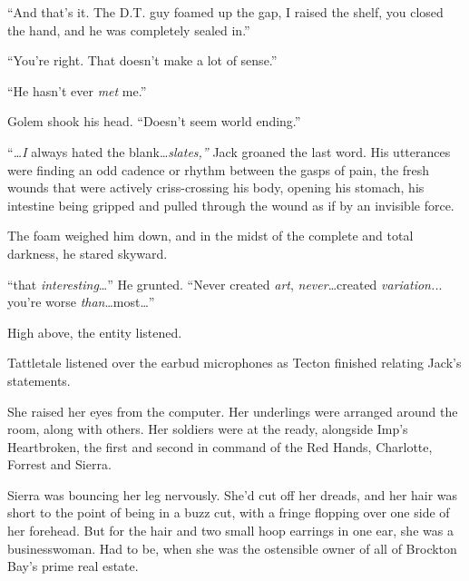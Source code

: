 ``And that's it.  The D.T. guy foamed up the gap, I raised the shelf, you closed the hand, and he was completely sealed in.''



``You're right.  That doesn't make a lot of sense.''



``He hasn't ever \emph{met} me.''



Golem shook his head.  ``Doesn't seem world ending.''



\sectionbreak



``\emph{\ldots}\emph{I }always hated the blank\ldots \emph{slates,'' }Jack groaned the last word.  His utterances were finding an odd cadence or rhythm between the gasps of pain, the fresh wounds that were actively criss-crossing his body, opening his stomach, his intestine being gripped and pulled through the wound as if by an invisible force.



The foam weighed him down, and in the midst of the complete and total darkness, he stared skyward.



``\ldotsNever that \emph{interesting}\ldots''  He grunted.  ``Never created \emph{art}, \emph{never}\ldots created \emph{variation..}.  you're worse \emph{than}\ldots most\ldots''



High above, the entity listened.



\sectionbreak



Tattletale listened over the earbud microphones as Tecton finished relating Jack's statements.



She raised her eyes from the computer.  Her underlings were arranged around the room, along with others.  Her soldiers were at the ready, alongside Imp's Heartbroken,  the first and second in command of the Red Hands, Charlotte, Forrest and Sierra.



Sierra was bouncing her leg nervously.  She'd cut off her dreads, and her hair was short to the point of being in a buzz cut, with a fringe flopping over one side of her forehead.  But for the hair and two small hoop earrings in one ear, she was a businesswoman.  Had to be, when she was the ostensible owner of all of Brockton Bay's prime real estate.



